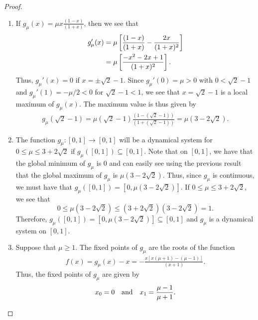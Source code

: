 \begin{proof}
  \begin{enumerate}
    \item If $\displaystyle g_\mu(x) = \mu x \frac{(1-x)}{(1+x)}$, then we see that
      \begin{align}\label{gmu}
        g_\mu'(x) &= \mu \left[\frac{(1-x)}{(1+x)} - \frac{2x}{(1+x)^2} \right] \notag \\
        &= \mu\left[\frac{-x^2-2x+1}{(1+x)^2}\right].
      \end{align}
      Thus, $g_\mu'(x) = 0$ if $x = \pm \sqrt{2} - 1$. Since $g_\mu'(0) = \mu > 0$ with $0 < \sqrt{2} - 1$
      and $g_\mu'(1) = -\mu/2 < 0$ for $\sqrt{2} -1 < 1$, we see that $x = \sqrt{2} - 1$ is a local maximum
      of $g_\mu(x)$. The maximum value is thus given by
      \begin{align*}
        g_\mu(\sqrt{2} - 1) = \mu (\sqrt{2} - 1) \frac{(1-(\sqrt{2} - 1))}{(1+(\sqrt{2} - 1))} = \mu(3 - 2\sqrt{2}).
      \end{align*}

    \item The function $g_\mu: [0, 1] \to [0, 1]$ will be a dynamical
      system for $0 \leq \mu \leq 3 + 2\sqrt{2}$ if $g_\mu([0,1]) \subseteq [0,1]$.
      Note that on $[0, 1]$, we have that the global minimum of $g_\mu$ is 0
      and can easily see using the previous result that the global maximum
      of $g_\mu$ is $\mu(3 - 2\sqrt{2})$. Thus, since $g_\mu$ is continuous, we must have that
      $g_\mu([0,1]) = [0, \mu(3 - 2\sqrt{2})]$. If $0 \leq \mu \leq 3 + 2\sqrt{2}$, we see that
      $$0 \leq \mu(3 - 2\sqrt{2}) \leq (3 + 2\sqrt{2})(3 - 2\sqrt{2}) = 1.$$
      Therefore,
      $g_\mu([0,1]) = [0, \mu(3 - 2\sqrt{2})] \subseteq [0, 1]$ and $g_\mu$ is a
      dynamical system on $[0, 1]$.

    \item Suppose that $\mu \geq 1$. The fixed points of $g_\mu$ are the roots of
      the function
      \begin{align*}
        f(x) = g_\mu(x) - x = - \frac{x[x(\mu+1) - (\mu - 1)]}{(x+1)}.
      \end{align*}
      Thus, the fixed points of $g_\mu$ are given by
      \begin{align}\label{gmu_fixed}
        x_0 = 0 \text{\quad and\quad} x_1 = \frac{\mu-1}{\mu+1}.
      \end{align}


\end{enumerate}
\end{proof}
